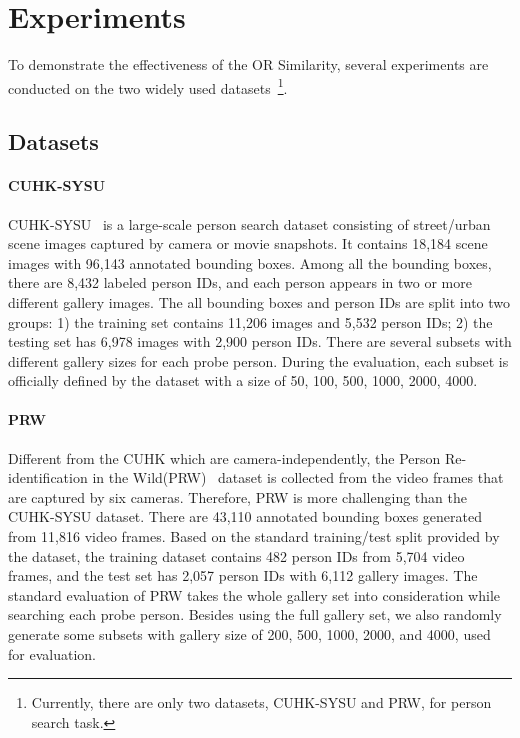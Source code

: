 \documentclass[journal]{IEEEtran}
\begin{document}
\section{Experiments}
To demonstrate the effectiveness of the OR Similarity, several experiments are conducted on the two widely used datasets~\footnote{Currently, there are only two datasets, CUHK-SYSU and PRW, for person search task.}.
\subsection{Datasets}
\paragraph{CUHK-SYSU} CUHK-SYSU~\cite{XiaoLWLW17} is a large-scale person search dataset consisting of street/urban scene images captured by camera or movie snapshots. It contains 18,184 scene images with 96,143 annotated bounding boxes. Among all the bounding boxes, there are 8,432 labeled person IDs, and each person appears in two or more different gallery images. The all bounding boxes and person IDs are split into two groups: 1) the training set contains 11,206 images and 5,532 person IDs; 2) the testing set has 6,978 images with 2,900 person IDs. There are several subsets with different gallery sizes for each probe person. During the evaluation, each subset is officially defined by the dataset with a size of 50, 100, 500, 1000, 2000, 4000.

\paragraph{PRW} Different from the CUHK which are camera-independently, the Person Re-identification in the Wild(PRW)~\cite{ZhengZSCYT17} dataset is collected from the video frames that are captured by six cameras. Therefore, PRW is more challenging than the CUHK-SYSU dataset. There are 43,110 annotated bounding boxes generated from 11,816 video frames. Based on the standard training/test split provided by the dataset, the training dataset contains 482 person IDs from 5,704 video frames, and the test set has 2,057 person IDs with 6,112 gallery images. The standard evaluation of PRW takes the whole gallery set into consideration while searching each probe person. Besides using the full gallery set, we also randomly generate some subsets with gallery size of 200, 500, 1000, 2000, and 4000, used for evaluation.
\end{document}
